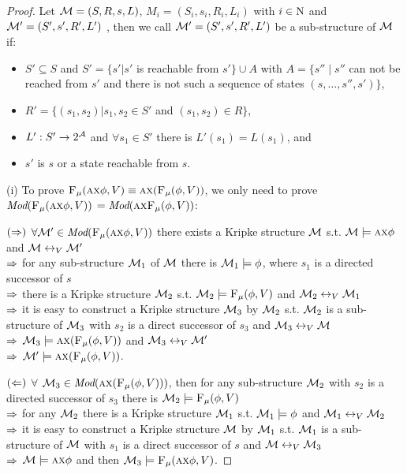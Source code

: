 \documentclass[runningheads]{llncs}
\begin{document}
\begin{proof}
Let ${\cal M}=(S, R, s, L)$, $M_i = (S_i, s_i, R_i, L_i)$ with $i \in \textmd{N}$ and ${\cal M}'=(S', s', R', L')$ , then we call ${\cal M}'=(S', s', R', L')$ be a sub-structure of ${\cal M}$ if:
\begin{itemize}
  \item $S' \subseteq S$ and $S'=\{s' | s'$ is reachable from $s'\} \cup A$ with $A = \{s'' \mid s''$ can not be reached from $s'$ and there is not such a sequence of states $(s,\dots, s'', s') \}$,
  \item $R' =\{(s_1, s_2)| s_1, s_2 \in S'$ and $(s_1, s_2) \in R\}$,
  \item $L': S' \rightarrow 2^{\cal A}$ and $\forall s_1 \in S'$ there is $L'(s_1) = L(s_1)$, and
  \item $s'$ is $s$ or a state reachable from $s$.
\end{itemize}

(i) To prove ${\textsc{F}_{\textsc{$\mu$}}}(\textsc{a} \textsc{x} \phi, V) \equiv \textsc{a} \textsc{x}({\textsc{F}_{\textsc{$\mu$}}}(\phi, V))$, we only need to prove $\textit{Mod}({\textsc{F}_{\textsc{$\mu$}}}(\textsc{a} \textsc{x} \phi, V))$ $= \textit{Mod}( \textsc{a}\textsc{x}{\textsc{F}_{\textsc{$\mu$}}}(\phi, V))$:

$(\Rightarrow)$ $\forall {\cal M}' \in \textit{Mod}({\textsc{F}_{\textsc{$\mu$}}}(\textsc{a} \textsc{x} \phi, V))$ there exists a Kripke structure ${\cal M}$ s.t. ${\cal M} \models \textsc{a} \textsc{x} \phi$ and ${\cal M} \leftrightarrow_V {\cal M}'$\\
$\Rightarrow$ for any sub-structure ${\cal M}_1$ of ${\cal M}$ there is ${\cal M}_1 \models \phi$, where $s_1$ is a directed successor of $s$ \\
$\Rightarrow$ there is a Kripke structure ${\cal M}_2$ s.t. ${\cal M}_2 \models {\textsc{F}_{\textsc{$\mu$}}}(\phi,V)$ and ${\cal M}_2 \leftrightarrow_V {\cal M}_1$\\
$\Rightarrow$ it is easy to construct a Kripke structure ${\cal M}_3$ by ${\cal M}_2$ s.t. ${\cal M}_2$ is a sub-structure of ${\cal M}_3$ with $s_2$ is a direct successor of $s_3$ and ${\cal M}_3 \leftrightarrow_V {\cal M}$\\
$\Rightarrow$ ${\cal M}_3 \models \textsc{a} \textsc{x} ({\textsc{F}_{\textsc{$\mu$}}}(\phi,V))$ and ${\cal M}_3 \leftrightarrow_V {\cal M}'$\\
$\Rightarrow$ ${\cal M}' \models \textsc{a} \textsc{x} ({\textsc{F}_{\textsc{$\mu$}}}(\phi,V))$.

$(\Leftarrow)$ $\forall$ ${\cal M}_3 \in \textit{Mod}(\textsc{a} \textsc{x} ({\textsc{F}_{\textsc{$\mu$}}}(\phi,V)))$, then for any sub-structure ${\cal M}_2$ with $s_2$ is a directed successor of $s_3$ there is ${\cal M}_2 \models {\textsc{F}_{\textsc{$\mu$}}}(\phi,V)$\\
$\Rightarrow$ for any ${\cal M}_2$ there is a Kripke structure ${\cal M}_1$ s.t. ${\cal M}_1 \models \phi$ and ${\cal M}_1 \leftrightarrow_V {\cal M}_2$\\
$\Rightarrow$ it is easy to construct a Kripke structure ${\cal M}$ by ${\cal M}_1$ s.t. ${\cal M}_1$ is a sub-structure of ${\cal M}$ with $s_1$ is a direct successor of $s$ and ${\cal M}\leftrightarrow_V {\cal M}_3$\\
$\Rightarrow$ ${\cal M} \models \textsc{a} \textsc{x} \phi$ and then ${\cal M}_3 \models {\textsc{F}_{\textsc{$\mu$}}}(\textsc{a} \textsc{x} \phi, V)$.



\end{proof}
\end{document}
